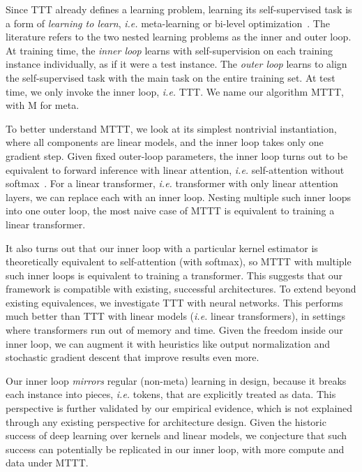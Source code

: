 \documentclass{article} %
\begin{document}
Since TTT already defines a learning problem, learning its self-supervised task is a form of \emph{learning to learn}, \textit{i.e.} meta-learning or bi-level optimization~\citep{schmidhuber1987evolutionary}.
The literature refers to the two nested learning problems as the inner and outer loop.
At training time, the \emph{inner loop} learns with self-supervision on each training instance individually, as if it were a test instance. The \emph{outer loop} learns to align the self-supervised task with the main task on the entire training set.
At test time, we only invoke the inner loop, \emph{i.e.} TTT.
We name our algorithm MTTT, with M for meta.

To better understand MTTT, we look at its simplest nontrivial instantiation, 
where all components are linear models, and the inner loop takes only one gradient step.
Given fixed outer-loop parameters, the inner loop turns out to be equivalent to forward inference with linear attention, \textit{i.e.} self-attention without softmax~\citep{katharopoulos2020transformers}.
For a linear transformer, \textit{i.e.} transformer with only linear attention layers, we can replace each with an inner loop.
Nesting multiple such inner loops into one outer loop, the most naive case of MTTT is equivalent to training a linear transformer.

It also turns out that our inner loop with a particular kernel estimator is theoretically equivalent to self-attention (with softmax), so MTTT with multiple such inner loops is equivalent to training a transformer.
This suggests that our framework is compatible with existing, successful architectures.
To extend beyond existing equivalences, we investigate TTT with neural networks.
This performs much better than TTT with linear models (\textit{i.e.} linear transformers), in settings where transformers run out of memory and time.
Given the freedom inside our inner loop, we can augment it with heuristics like output normalization and stochastic gradient descent that improve results even more.

Our inner loop \emph{mirrors} regular (non-meta) learning in design, because it breaks each instance into pieces, \textit{i.e.} tokens, that are explicitly treated as data.
This perspective is further validated by our empirical evidence, which is not explained through any existing perspective for architecture design.
Given the historic success of deep learning over kernels and linear models, we conjecture that such success can potentially be replicated in our inner loop, with more compute and data under MTTT.
\end{document}
